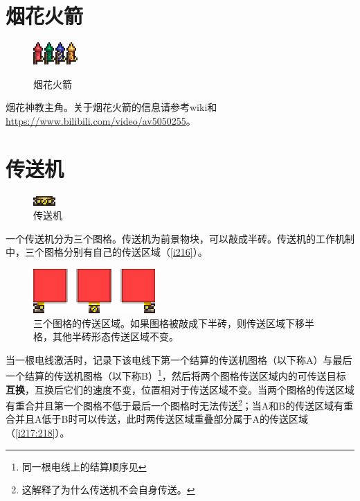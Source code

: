 \section{烟花火箭}
\begin{figure}[!ht]
\centering
\includegraphics{figures/Red_Rocket.png}\quad\includegraphics{figures/Green_Rocket.png}\quad\includegraphics{figures/Blue_Rocket.png}\quad\includegraphics{figures/Yellow_Rocket.png}
\caption{烟花火箭}
\end{figure}
烟花神教主角。关于烟花火箭的信息请参考wiki和\url{https://www.bilibili.com/video/av5050255}。

\section{传送机}\label{chuansongji}
\begin{figure}[!ht]
\centering
\includegraphics{figures/Teleporter.png}
\caption{传送机}
\end{figure}
一个传送机分为三个图格。传送机为前景物块，可以敲成半砖。传送机的工作机制中，三个图格分别有自己的传送区域（\autoref{i216}）。

\begin{figure}[!ht]
\centering
\includegraphics{images/216.png}
\caption{三个图格的传送区域。如果图格被敲成下半砖，则传送区域下移半格，其他半砖形态传送区域不变。}
\label{i216}
\end{figure}

当一根电线激活时，记录下该电线下第一个结算的传送机图格（以下称A）与最后一个结算的传送机图格（以下称B）\footnote{同一根电线上的结算顺序见}，然后将两个图格传送区域内的可传送目标\textbf{互换}，互换后它们的速度不变，位置相对于传送区域不变。当两个图格的传送区域有重合并且第一个图格不低于最后一个图格时无法传送\footnote{这解释了为什么传送机不会自身传送。}；当A和B的传送区域有重合并且A低于B时可以传送，此时两传送区域重叠部分属于A的传送区域（\autoref{i217:218}）。

